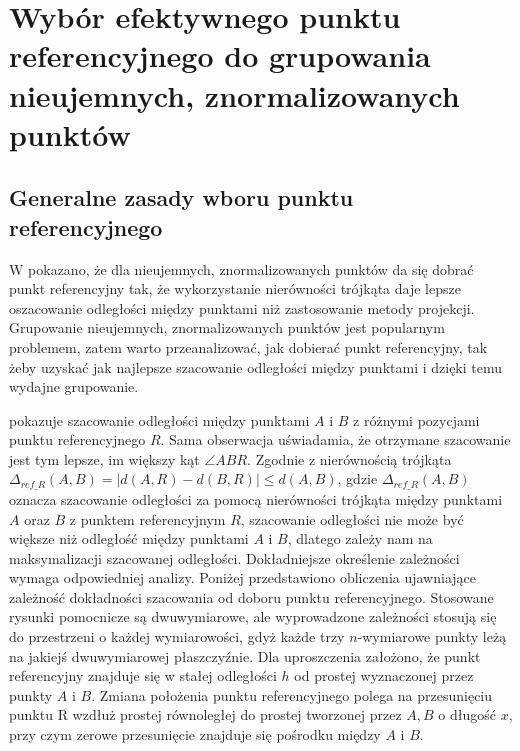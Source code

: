 \section{Wybór efektywnego punktu referencyjnego do grupowania nieujemnych, znormalizowanych punktów}
\subsection{Generalne zasady wboru punktu referencyjnego}
W \cite{tivsp} pokazano, że dla nieujemnych, znormalizowanych punktów da się dobrać punkt referencyjny tak, że wykorzystanie nierówności trójkąta daje lepsze oszacowanie odległości między punktami niż zastosowanie metody projekcji. Grupowanie nieujemnych, znormalizowanych punktów jest popularnym problemem, zatem warto przeanalizować, jak dobierać punkt referencyjny, tak żeby uzyskać jak najlepsze szacowanie odległości między punktami i dzięki temu wydajne grupowanie.\par


 pokazuje szacowanie odległości między punktami $ A $ i $ B $ z różnymi pozycjami punktu referencyjnego $ R $. Sama obserwacja uświadamia, że otrzymane szacowanie jest tym lepsze, im większy kąt $ \angle{ABR} $. Zgodnie z nierównością trójkąta $ \Delta_{ref\_R}(A,B) = |d(A,R) - d(B,R)| \le d(A,B) $, gdzie $ \Delta_{ref\_R}(A,B) $ oznacza szacowanie odległości za pomocą nierówności trójkąta między punktami $ A $ oraz $ B $ z punktem referencyjnym $ R $, szacowanie odległości nie może być większe niż odległość między punktami $ A $ i $ B $, dlatego zależy nam na maksymalizacji szacowanej odległości. Dokładniejsze określenie zależności wymaga odpowiedniej analizy. Poniżej przedstawiono obliczenia ujawniające zależność dokładności szacowania od doboru punktu referencyjnego. Stosowane rysunki pomocnicze są dwuwymiarowe, ale wyprowadzone zależności stosują się do przestrzeni o każdej wymiarowości, gdyż każde trzy $ n $-wymiarowe punkty leżą na jakiejś dwuwymiarowej płaszczyźnie. Dla uproszczenia założono, że punkt referencyjny znajduje się w stałej odległości $ h $ od prostej wyznaczonej przez punkty $ A $ i $ B $. Zmiana położenia punktu referencyjnego polega na przesunięciu punktu R wzdłuż prostej równoległej do prostej tworzonej przez $ A, B $ o długość $ x $, przy czym zerowe przesunięcie znajduje się pośrodku między $ A $ i $ B $.\par



